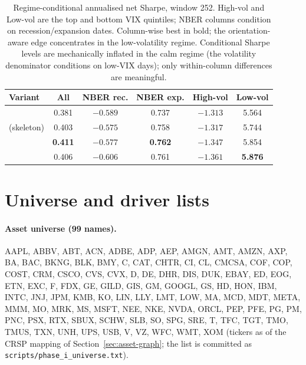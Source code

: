 \begin{table}[h]
  \centering
  \caption{Regime-conditional annualised net Sharpe, window 252. High-vol
    and Low-vol are the top and bottom VIX quintiles; NBER columns condition
    on recession/expansion dates. Column-wise best in bold; the
    orientation-aware edge concentrates in the low-volatility regime.
    Conditional Sharpe levels are mechanically inflated in the calm
    regime (the volatility denominator conditions on low-VIX days); only
    within-column differences are meaningful.}
  \label{tab:regime-full}
  \begin{tabular}{l c c c c c}
    \toprule
    Variant & All & NBER rec. & NBER exp. & High-vol & Low-vol \\
    \midrule
    \HRP{}     & 0.381 & $-0.589$ & 0.737 & $\mathbf{-1.313}$ & 5.564 \\
    \skelsamp{} (skeleton)     & 0.403 & $\mathbf{-0.575}$ & 0.758 & $-1.317$ & 5.744 \\
    \skelsem{}                & \textbf{0.411} & $-0.577$ & \textbf{0.762} & $-1.347$ & 5.854 \\
    \orientsem{}               & 0.406 & $-0.606$ & 0.761 & $-1.361$ & \textbf{5.876} \\
    \bottomrule
  \end{tabular}
\end{table}

\section{Universe and driver lists}
\label{app:universe}

\paragraph{Asset universe (99 names).} AAPL, ABBV, ABT, ACN, ADBE, ADP,
AEP, AMGN, AMT, AMZN, AXP, BA, BAC, BKNG, BLK, BMY, C, CAT, CHTR, CI, CL,
CMCSA, COF, COP, COST, CRM, CSCO, CVS, CVX, D, DE, DHR, DIS, DUK, EBAY,
ED, EOG, ETN, EXC, F, FDX, GE, GILD, GIS, GM, GOOGL, GS, HD, HON, IBM,
INTC, JNJ, JPM, KMB, KO, LIN, LLY, LMT, LOW, MA, MCD, MDT, META, MMM, MO,
MRK, MS, MSFT, NEE, NKE, NVDA, ORCL, PEP, PFE, PG, PM, PNC, PSX, RTX,
SBUX, SCHW, SLB, SO, SPG, SRE, T, TFC, TGT, TMO, TMUS, TXN, UNH, UPS,
USB, V, VZ, WFC, WMT, XOM (tickers as of the CRSP mapping of
Section~\ref{sec:asset-graph}; the list is committed as
\texttt{scripts/phase\_i\_universe.txt}).

